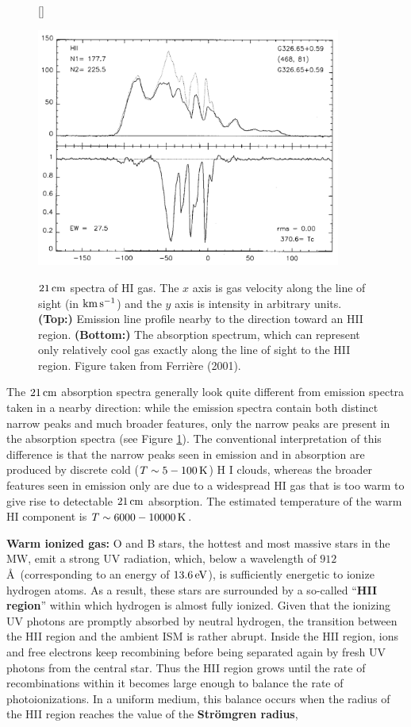 \documentclass[a4paper,10pt]{article}
\begin{document}
\begin{figure}[t]
    [\FBwidth]
    {\caption{\footnotesize{$21\,{\rm cm}$ spectra of HI gas. The $x$ axis is gas velocity along the line of sight (in ${\rm km\,s^{-1}}$) and the $y$ axis is intensity in arbitrary units. \textbf{(Top:)} Emission line profile nearby to the direction toward an HII region. \textbf{(Bottom:)} The absorption spectrum, which can represent only relatively cool gas exactly along the line of sight to the HII region. Figure taken from Ferri\`ere (2001).}}
    \label{fig:21cmemissabs}}
    {\includegraphics[width=10cm]{figures/21cm_emission_abs.png}}
\end{figure}

{\noindent}The $21\,{\rm cm}$ absorption spectra generally look quite different from emission spectra taken in a nearby direction: while the emission spectra contain both distinct narrow peaks and much broader features, only the narrow peaks are present in the absorption spectra (see Figure \ref{fig:21cmemissabs}). The conventional interpretation of this difference is that the narrow peaks seen in emission and in absorption are produced by discrete cold ($T\sim5-100\,{\rm K}$) H I clouds, whereas the broader features seen in emission only are due to a widespread HI gas that is too warm to give rise to detectable $21\,{\rm cm}$ absorption. The estimated temperature of the warm HI component is $T\sim6000-10000\,{\rm K}$.

{\noindent}\textbf{Warm ionized gas:} O and B stars, the hottest and most massive stars in the MW, emit a strong UV radiation, which, below a wavelength of $912$\AA~(corresponding to an energy of $13.6\,{\rm eV}$), is sufficiently energetic to ionize hydrogen atoms. As a result, these stars are surrounded by a so-called ``\textbf{HII region}'' within which hydrogen is almost fully ionized. Given that the ionizing UV photons are promptly absorbed by neutral hydrogen, the transition between the HII region and the ambient ISM is rather abrupt. Inside the HII region, ions and free electrons keep recombining before being separated again by fresh UV photons from the central star. Thus the HII region grows until the rate of recombinations within it becomes large enough to balance the rate of photoionizations. In a uniform medium, this balance occurs when the radius of the HII region reaches the value of the \textbf{Str\"omgren radius},
\end{document}
